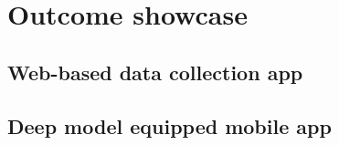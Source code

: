 \chapter{Outcome showcase}
\section{Web-based data collection app}

\section{Deep model equipped mobile app}
